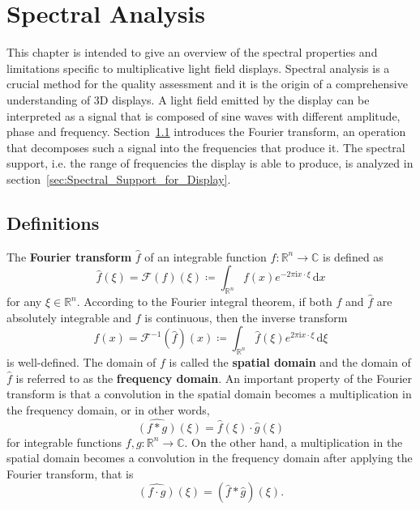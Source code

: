 \chapter{Spectral Analysis}


This chapter is intended to give an overview of the spectral properties and limitations specific to multiplicative light field displays.
Spectral analysis is a crucial method for the quality assessment and it is the origin of a comprehensive understanding of 3D displays. 
A light field emitted by the display can be interpreted as a signal that is composed of sine waves with different amplitude, phase and frequency.
Section~\ref{sec:Definitions} introduces the Fourier transform, an operation that decomposes such a signal into the frequencies that produce it.
The spectral support, i.e. the range of frequencies the display is able to produce, is analyzed in section~\ref{sec:Spectral_Support_for_Display}. 

\section{Definitions}
\label{sec:Definitions}

The \textbf{Fourier transform} $\hat{f}$ of an integrable function $f \colon \mathbb{R}^n \to \mathbb{C}$ is defined as 
\begin{equation}
	\hat{f}(\xi) = \mathcal{F}(f)(\xi) \coloneqq \int_{\mathbb{R}^n} f(x) e^{-2 \pi \mathrm{i} x \cdot \xi} \, \mathrm{d}x
\end{equation}
for any $\xi \in \mathbb{R}^n$. 
According to the Fourier integral theorem, if both $f$ and $\hat{f}$ are absolutely integrable and $f$ is continuous, then the inverse transform 
\begin{equation}
	f(x) = \mathcal{F}^{-1}(\hat{f})(x) \coloneqq \int_{\mathbb{R}^n} \hat{f}(\xi) e^{2 \pi \mathrm{i} x \cdot \xi} \, \mathrm{d}\xi
\end{equation}
is well-defined.
The domain of $f$ is called the \textbf{spatial domain} and the domain of $\hat{f}$ is referred to as the \textbf{frequency domain}.
An important property of the Fourier transform is that a convolution in the spatial domain becomes a multiplication in the frequency domain, or in other words, 
\begin{equation}
	\widehat{(f \ast g)}(\xi) = \hat{f}(\xi) \cdot \hat{g}(\xi)
\end{equation}
for integrable functions $f, g \colon \mathbb{R}^n \to \mathbb{C}$.
On the other hand, a multiplication in the spatial domain becomes a convolution in the frequency domain after applying the Fourier transform, that is
\begin{equation}
	\widehat{(f \cdot g)}(\xi) = (\hat{f} \ast \hat{g})(\xi).
\end{equation}


